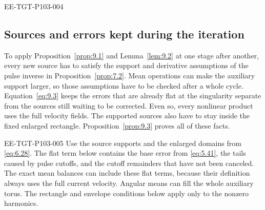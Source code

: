\begin{EESegment}{EE-TGT-P103-004}
\subsection{Sources and errors kept during the iteration}\label{sec:9.2}
To apply Proposition~\ref{prop:9.1} and Lemma~\ref{lem:9.2} at one stage after another, every new
source has to satisfy the support and derivative assumptions of the pulse inverse in
Proposition~\ref{prop:7.2}. Mean operations can make the auxiliary support larger, so those
assumptions have to be checked after a whole cycle. Equation~\eqref{eq:9.3} keeps the errors that
are already flat at the singularity separate from the sources still waiting to be corrected. Even
so, every nonlinear product uses the full velocity fields. The supported sources also have to stay
inside the fixed enlarged rectangle. Proposition~\ref{prop:9.3} proves all of these facts.
\end{EESegment}

\begin{EESegment}{EE-TGT-P103-005}
Use the source supports  and the enlarged domains
 from \eqref{eq:6.28}. The flat term below contains the
base error  from \eqref{eq:5.41}, the tails caused by pulse
cutoffs, and the cutoff remainders that have not been canceled. The exact mean balances can include
these flat terms, because their definition always uses the full current velocity. Angular means can
fill the whole auxiliary torus. The rectangle and envelope conditions below apply only to the
nonzero harmonics.
\end{EESegment}

